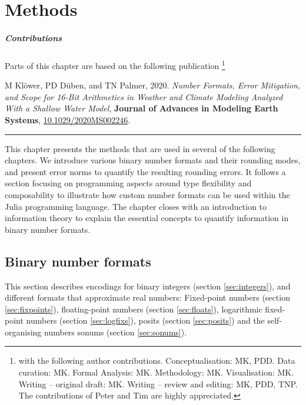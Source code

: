 \chapter{Methods}
\label{chap:methods}

\small \paragraph{Contributions} Parts of this chapter are based on the following publication \footnote{with the following author contributions.
Conceptualisation: MK, PDD. Data curation: MK. Formal Analysis: MK. Methodology: MK. Visualisation: MK. Writing – original draft:
MK. Writing – review and editing: MK, PDD, TNP. The contributions of Peter and Tim are highly appreciated.}

\vspace{\baselineskip}
\indent M Klöwer, PD Düben, and TN Palmer, 2020. \emph{Number Formats, Error Mitigation, and Scope for 16-Bit Arithmetics in Weather and Climate Modeling Analyzed With a Shallow Water Model}, \textbf{Journal of Advances in Modeling Earth Systems}, \href{https://doi.org/10.1029/2020MS002246}{10.1029/2020MS002246}.
\vspace{\baselineskip}
\hrule
\vspace{\baselineskip}
\normalsize

This chapter presents the methods that are used in several of the following chapters. We introduce various binary number formats and
their rounding modes, and present error norms to quantify the resulting rounding errors. It follows a section focusing on
programming aspects around type flexibility and composability to illustrate how custom number formats can be used within
the Julia programming language. The chapter closes with an introduction to information theory to explain the essential concepts
to quantify information in binary number formats.

\section{Binary number formats}
\label{sec:numbers}

This section describes encodings for binary integers (section \ref{sec:integers}), and different formats that approximate real numbers:
Fixed-point numbers (section \ref{sec:fixpoints}),
floating-point numbers (section \ref{sec:floats}),
logarithmic fixed-point numbers (section \ref{sec:logfixs}),
posits (section \ref{sec:posits}) and the self-organising numbers sonums (section \ref{sec:sonums}).

